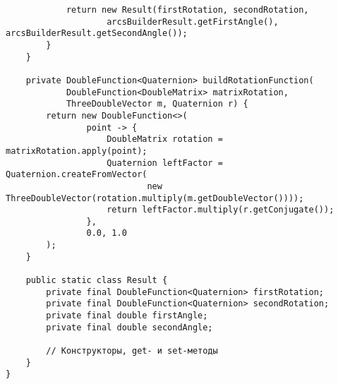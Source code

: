 \begin{verbatim}
            return new Result(firstRotation, secondRotation,
                    arcsBuilderResult.getFirstAngle(), arcsBuilderResult.getSecondAngle());
        }
    }

    private DoubleFunction<Quaternion> buildRotationFunction(
            DoubleFunction<DoubleMatrix> matrixRotation,
            ThreeDoubleVector m, Quaternion r) {
        return new DoubleFunction<>(
                point -> {
                    DoubleMatrix rotation = matrixRotation.apply(point);
                    Quaternion leftFactor = Quaternion.createFromVector(
                            new ThreeDoubleVector(rotation.multiply(m.getDoubleVector())));
                    return leftFactor.multiply(r.getConjugate());
                },
                0.0, 1.0
        );
    }

    public static class Result {
        private final DoubleFunction<Quaternion> firstRotation;
        private final DoubleFunction<Quaternion> secondRotation;
        private final double firstAngle;
        private final double secondAngle;

        // Конструкторы, get- и set-методы
    }
}
\end{verbatim}

